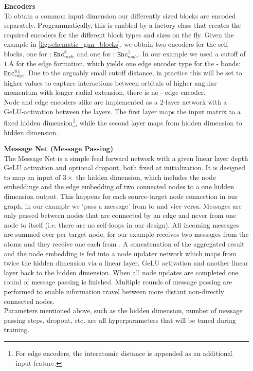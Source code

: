 \textbf{Encoders}\\
To obtain a common input dimension our differently sized blocks are encoded separately. Programmatically, this is enabled by a factory class that creates the required encoders for the different block types and sizes on the fly. Given the  example in \autoref{fig:schematic_gnn_blocks}, we obtain two encoders for the self-blocks, one for : $\texttt{Enc}^{8}_{node}$ and one for : $\texttt{Enc}^{1}_{node}$. In our example we used a cutoff of $\SI{1}{\angstrom}$ for the edge formation, which yields one edge encoder type for the - bonds: $\texttt{Enc}^{8\,1}_{edge}$. Due to the arguably small cutoff distance, in practice this will be set to higher values to capture interactions between orbitals of higher angular momentum with longer radial extension, there is no - edge encoder. \\
Node and edge encoders alike are implemented as a 2-layer network with a GeLU-activation between the layers. The first layer maps the input matrix to a fixed hidden dimension\footnote{For edge encoders, the interatomic distance is appended as an additional input feature.}, while the second layer maps from hidden dimension to hidden dimension. 

\textbf{Message Net (Message Passing)}\\
The Message Net is a simple feed forward network with a given linear layer depth GeLU activation and optional dropout, both fixed at initialization. It is designed to map an input of $3 \times$ the hidden dimension, which includes the node embeddings and the edge embedding of two connected nodes to a one hidden dimension output. This happens for each source-target node connection in our graph, in our example we `pass a message' from  to  and vice versa. Messages are only passed between nodes that are connected by an edge and never from one node to itself (i.e. there are no self-loops in our design). All incoming messages are summed over per target node, for our example  receives two messages from the  atoms and they receive one each from . A concatenation of the aggregated result and the node embedding is fed into a node updater network which maps from twice the hidden dimension via a linear layer, GeLU activation and another linear layer back to the hidden dimension. When all node updates are completed one round of message passing is finished. Multiple rounds of message passing are performed to enable information travel between more distant non-directly connected nodes.\\
Parameters mentioned above, such as the hidden dimension, number of message passing steps, dropout, etc. are all hyperparameters that will be tuned during training. 

